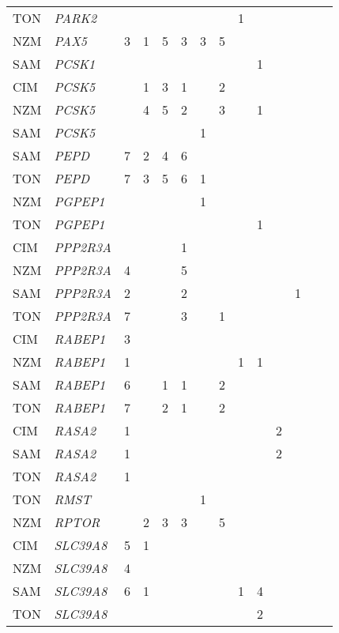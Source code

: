 \documentclass[twoside,openright]{report}
\begin{document}
\begin{ThreePartTable}
\begin{longtable}[t]{llllllllllllll}
TON & \em{PARK2} &  &  &  &  &  &  & 1 &  &  &  &  & \\
NZM & \em{PAX5} & 3 & 1 & 5 & 3 & 3 & 5 &  &  &  &  &  & \\
SAM & \em{PCSK1} &  &  &  &  &  &  &  & 1 &  &  &  & \\
CIM & \em{PCSK5} &  & 1 & 3 & 1 &  & 2 &  &  &  &  &  & \\
NZM & \em{PCSK5} &  & 4 & 5 & 2 &  & 3 &  & 1 &  &  &  & \\
SAM & \em{PCSK5} &  &  &  &  & 1 &  &  &  &  &  &  & \\
SAM & \em{PEPD} & 7 & 2 & 4 & 6 &  &  &  &  &  &  &  & \\
TON & \em{PEPD} & 7 & 3 & 5 & 6 & 1 &  &  &  &  &  &  & \\
NZM & \em{PGPEP1} &  &  &  &  & 1 &  &  &  &  &  &  & \\
TON & \em{PGPEP1} &  &  &  &  &  &  &  & 1 &  &  &  & \\
CIM & \em{PPP2R3A} &  &  &  & 1 &  &  &  &  &  &  &  & \\
NZM & \em{PPP2R3A} & 4 &  &  & 5 &  &  &  &  &  &  &  & \\
SAM & \em{PPP2R3A} & 2 &  &  & 2 &  &  &  &  &  & 1 &  & \\
TON & \em{PPP2R3A} & 7 &  &  & 3 &  & 1 &  &  &  &  &  & \\
CIM & \em{RABEP1} & 3 &  &  &  &  &  &  &  &  &  &  & \\
NZM & \em{RABEP1} & 1 &  &  &  &  &  & 1 & 1 &  &  &  & \\
SAM & \em{RABEP1} & 6 &  & 1 & 1 &  & 2 &  &  &  &  &  & \\
TON & \em{RABEP1} & 7 &  & 2 & 1 &  & 2 &  &  &  &  &  & \\
CIM & \em{RASA2} & 1 &  &  &  &  &  &  &  & 2 &  &  & \\
SAM & \em{RASA2} & 1 &  &  &  &  &  &  &  & 2 &  &  & \\
TON & \em{RASA2} & 1 &  &  &  &  &  &  &  &  &  &  & \\
TON & \em{RMST} &  &  &  &  & 1 &  &  &  &  &  &  & \\
NZM & \em{RPTOR} &  & 2 & 3 & 3 &  & 5 &  &  &  &  &  & \\
CIM & \em{SLC39A8} & 5 & 1 &  &  &  &  &  &  &  &  &  & \\
NZM & \em{SLC39A8} & 4 &  &  &  &  &  &  &  &  &  &  & \\
SAM & \em{SLC39A8} & 6 & 1 &  &  &  &  & 1 & 4 &  &  &  & \\
TON & \em{SLC39A8} &  &  &  &  &  &  &  & 2 &  &  &  & \\

\end{longtable}
\end{ThreePartTable}
\end{document}
